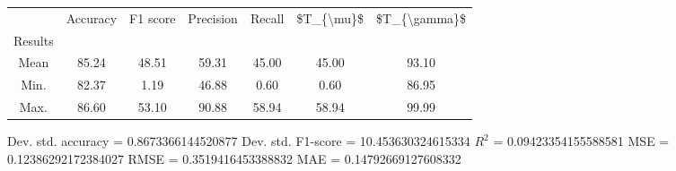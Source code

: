 \begin{tabular}{|c|c|c|c|c|c|c|}
\toprule
{} &  Accuracy &  F1 score &  Precision &  Recall &  \$T\_\{\textbackslash mu\}\$ &  \$T\_\{\textbackslash gamma\}\$ \\
Results &           &           &            &         &            &               \\
\hline
Mean    &     85.24 &     48.51 &      59.31 &   45.00 &      45.00 &         93.10 \\
Min.    &     82.37 &      1.19 &      46.88 &    0.60 &       0.60 &         86.95 \\
Max.    &     86.60 &     53.10 &      90.88 &   58.94 &      58.94 &         99.99 \\
\bottomrule
\end{tabular}

 Dev. std. accuracy = 0.8673366144520877
 Dev. std. F1-score = 10.453630324615334
 $R^2$ = 0.09423354155588581
 MSE = 0.12386292172384027
 RMSE = 0.3519416453388832
 MAE = 0.14792669127608332